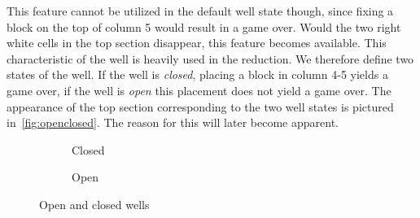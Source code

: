 This feature cannot be utilized in the default well state though, since fixing a block on the top of column 5 would result in a game over. Would the two right white cells in the top section disappear, this feature becomes available. This characteristic of the well is heavily used in the reduction. We therefore define two states of the well. If the well is \textit{closed}, placing a block in column 4-5 yields a game over, if the well is \textit{open} this placement does not yield a game over. The appearance of the top section corresponding to the two well states is pictured in~\autoref{fig:openclosed}. The reason for this will later become apparent.

\begin{figure}[H]
    \centering
    \begin{subfigure}[b]{0.15\linewidth}
        \caption{Closed}
    \end{subfigure}
    \hspace{0.02\linewidth}
    \begin{subfigure}[b]{0.15\linewidth}
        \caption{Open}
    \end{subfigure}
    \caption{Open and closed wells}
    \label{fig:openclosed}
\end{figure}


